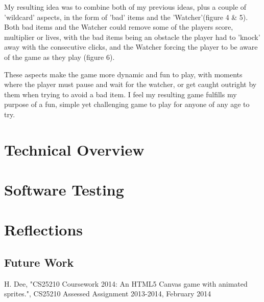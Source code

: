 \documentclass{article}
\begin{document}
My resulting idea was to combine both of my previous ideas, plus a couple of 'wildcard' aspects, in the form of 'bad' items and the 'Watcher'(figure 4 \& 5). Both bad items and the Watcher could remove some of the players score, multiplier or lives, with the bad items being an obstacle the player had to 'knock' away with the consecutive clicks, and the Watcher forcing the player to be aware of the game as they play (figure 6). 

These aspects make the game more dynamic and fun to play, with moments where the player must pause and wait for the watcher, or get caught outright by them when trying to avoid a bad item. I feel my resulting game fulfills my purpose of a fun, simple yet challenging game to play for anyone of any age to try.


\section{Technical Overview}



\section{Software Testing}


\section{Reflections}
\subsection{Future Work}

\clearpage


\begin{thebibliography}{1}

 H. Dee, "CS25210 Coursework 2014: An HTML5 Canvas game with animated sprites.", CS25210 Assessed Assignment 2013-2014, February 2014


\end{thebibliography}
\end{document}

